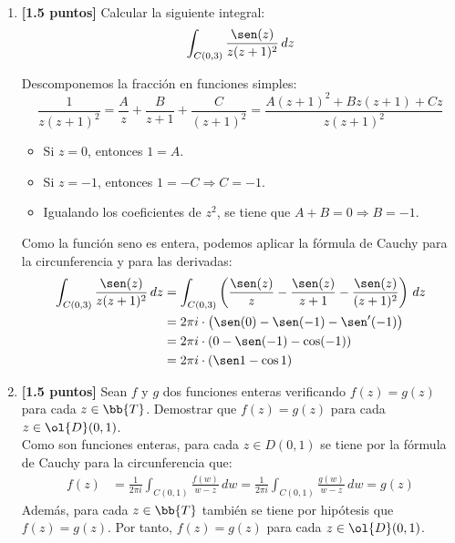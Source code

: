\documentclass[12pt]{article}
\begin{document}
    \begin{ejercicio}~
        \begin{enumerate}
            \item \textbf{[1.5 puntos]} Calcular la siguiente integral:
            \begin{equation*}
                \int_{C(0,3)} \frac{\sen(z)}{z(z+1)^2} \, dz
            \end{equation*}

            Descomponemos la fracción en funciones simples:
            \begin{equation*}
                \dfrac{1}{z(z+1)^2} = \dfrac{A}{z} + \dfrac{B}{z+1} + \dfrac{C}{(z+1)^2}
                = \dfrac{A(z+1)^2 + Bz(z+1) + Cz}{z(z+1)^2}
            \end{equation*}
            \begin{itemize}
                \item Si $z=0$, entonces $1=A$.
                \item Si $z=-1$, entonces $1=-C\Longrightarrow C=-1$.
                \item Igualando los coeficientes de $z^2$, se tiene que $A+B=0\Longrightarrow B=-1$.
            \end{itemize}

            Como la función seno es entera, podemos aplicar la fórmula de Cauchy para la circunferencia y para las derivadas:
            \begin{align*}
                \int_{C(0,3)} \frac{\sen(z)}{z(z+1)^2} \, dz &= \int_{C(0,3)} \left(\frac{\sen(z)}{z} - \frac{\sen(z)}{z+1} - \frac{\sen(z)}{(z+1)^2}\right) \, dz\\
                &= 2\pi i\cdot\left(\sen(0) - \sen(-1) - \sen'(-1)\right)\\
                &= 2\pi i\cdot\left(0 - \sen(-1) - \cos(-1)\right)\\
                &= 2\pi i\cdot\left(\sen 1 - \cos 1\right)
            \end{align*}
            \item \textbf{[1.5 puntos]} Sean $f$ y $g$ dos funciones enteras verificando $f(z) = g(z)$ para cada $z \in \bb{T}$. Demostrar que $f(z) = g(z)$ para cada $z \in \ol{D}(0, 1)$.\\
            
            Como son funciones enteras, para cada $z\in D(0,1)$ se tiene por la fórmula de Cauchy para la circunferencia que:
            \begin{align*}
                f(z) &= \frac{1}{2\pi i} \int_{C(0,1)} \frac{f(w)}{w-z} \, dw
                = \frac{1}{2\pi i} \int_{C(0,1)} \frac{g(w)}{w-z} \, dw
                = g(z)
            \end{align*}
            Además, para cada $z\in \bb{T}$ también se tiene por hipótesis que $f(z)=g(z)$. Por tanto, $f(z)=g(z)$ para cada $z\in \ol{D}(0,1)$.
            


\end{enumerate}
\end{ejercicio}
\end{document}
